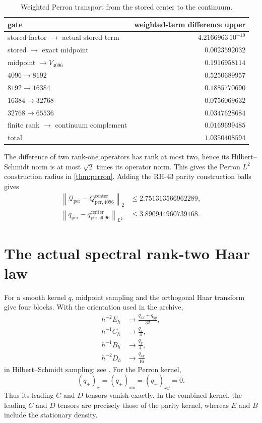 \documentclass[11pt]{article}
\theoremstyle{definition}
\theoremstyle{remark}
\newcommand{\cQ}{\mathcal Q}
\newcommand{\norm}[1]{\left\lVert #1\right\rVert}
\begin{document}
\begin{table}[H]
\centering
\caption{Weighted Perron transport from the stored center to the continuum.}
\label{tab:perron-transport}
\begin{tabular}{@{}lr@{}}
\toprule
gate & weighted-term difference upper\\
\midrule
stored factor $\to$ actual stored term & $4.2166963\,10^{-10}$\\
stored $\to$ exact midpoint & $0.0023592032$\\
midpoint $\to V_{4096}$ & $0.1916958114$\\
$4096\to8192$ & $0.5250689957$\\
$8192\to16384$ & $0.1885770690$\\
$16384\to32768$ & $0.0756069632$\\
$32768\to65536$ & $0.0347628684$\\
finite rank $\to$ continuum complement & $0.0169699485$\\
\midrule
total & $1.0350408594$\\
\bottomrule
\end{tabular}
\end{table}

The difference of two rank-one operators has rank at most two, hence its
Hilbert--Schmidt norm is at most $\sqrt2$ times its operator norm.  This gives
the Perron $L^2$ construction radius in \cref{thm:perron}.  Adding the RH-43
parity construction balls gives
\begin{align}
 \norm{\cQ_{\mathrm{per}}-Q_{\mathrm{per},4096}^{\mathrm{center}}}_2
 &\le2.751313566962289,
 \label{eq:rank-two-construction-op}\\
 \norm{q_{\mathrm{per}}-q_{\mathrm{per},4096}^{\mathrm{center}}}_{L^2}
 &\le3.890944960739168.
 \label{eq:rank-two-construction-hs}
\end{align}

\section{The actual spectral rank-two Haar law}
\label{sec:rank-two-haar}

For a smooth kernel $q$, midpoint sampling and the orthogonal Haar transform
give four blocks.  With the orientation used in the archive,
\begin{align}
 h^{-2}E_h&\longrightarrow\frac{q_{xx}+q_{yy}}{32},
 \label{eq:haar-E}\\
 h^{-1}C_h&\longrightarrow\frac{q_x}{4},
 \label{eq:haar-C}\\
 h^{-1}B_h&\longrightarrow\frac{q_y}{4},
 \label{eq:haar-B}\\
 h^{-2}D_h&\longrightarrow\frac{q_{xy}}{16}
 \label{eq:haar-D}
\end{align}
in Hilbert--Schmidt sampling; see
\citet{WangHaar2026,WangParityKernel2026}.  For the Perron kernel,
\begin{equation}
 (q_+)_x=(q_+)_{xx}=(q_+)_{xy}=0.
 \label{eq:perron-haar-zero}
\end{equation}
Thus its leading $C$ and $D$ tensors vanish exactly.  In the combined
kernel, the leading $C$ and $D$ tensors are precisely those of the parity
kernel, whereas $E$ and $B$ include the stationary density.
\end{document}

